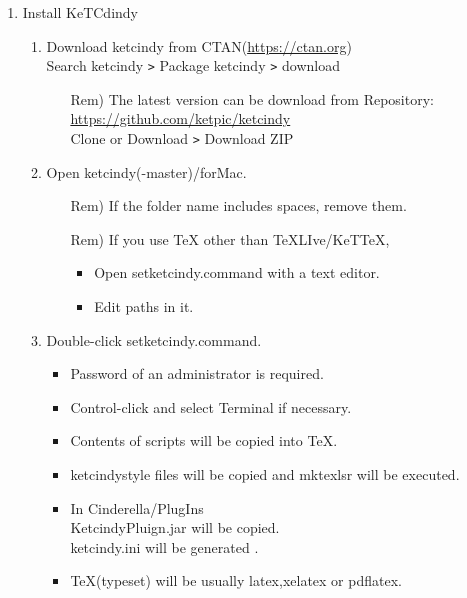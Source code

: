 \documentclass{article}
\begin{document}
\begin{enumerate}[\bf\large 1.]
\item Install KeTCdindy
  \begin{enumerate}[(1)]
  \item Download ketcindy from CTAN(\url{https://ctan.org})\\
  \hspace*{10mm}Search ketcindy \verb|>| Pack­age ketcindy \verb|>| download
    \begin{itemize}
    \item[Rem)]The latest version can be download from Repository:\\
        \hspace*{5mm}\url{https://github.com/ket­pic/ketcindy}\\
        \hspace*{10mm}Clone or Download \verb|>| Download ZIP
    \end{itemize}
  \item Open ketcindy(-master)/forMac.
    \begin{itemize}
    \item[Rem)]If the folder name includes spaces, remove them.
    \item[Rem)]If you use TeX other than TeXLIve/KeTTeX,
      \begin{itemize}
      \item Open setketcindy.command with a text editor.
      \item Edit paths in it.
      \end{itemize}
    \end{itemize}
  \item Double-click setketcindy.command.
    \begin{itemize}
    \item Password of an administrator is required.
    \item Control-click and select Terminal if necessary. 
    \item Contents of scripts will be copied into TeX.
    \item ketcindystyle files will be copied and mktexlsr will be executed.
    \item In Cinderella/PlugIns\\
    \hspace*{5mm}KetcindyPluign.jar will be copied.\\
    \hspace*{5mm}ketcindy.ini will be generated .
    \item TeX(typeset) will be usually latex,xelatex or pdflatex.
    \end{itemize}

\end{enumerate}
\end{enumerate}
\end{document}
